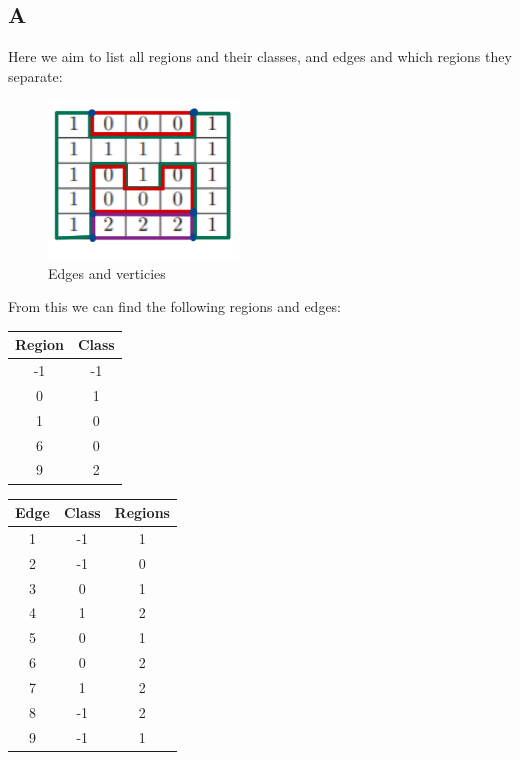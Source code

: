 \documentclass{article}
\begin{document}
\subsection*{A}

Here we aim to list all regions and their classes, and edges and which regions they separate:

\begin{figure}[H]
    \centering
    \includegraphics[width = 0.45\textwidth]{imgs/edges_verticies.png}
    \caption{Edges and verticies}
    \label{fig:edges_verticies}
\end{figure}

From this we can find the following regions and edges:

\begin{center}
    \begin{tabular}{ | c | c | }
        Region & Class \\
        \hline
        -1 & -1 \\
        0 & 1 \\
        1 & 0 \\
        6 & 0\\
        9 & 2 \\
    \end{tabular}
\end{center}

\begin{center}
    \begin{tabular}{| c | c | c |}
        Edge & Class & Regions \\
        \hline
        1 & -1 & 1 \\
        2 & -1 & 0 \\
        3 & 0 & 1 \\
        4 & 1 & 2 \\
        5 & 0 & 1 \\
        6 & 0 & 2 \\
        7 & 1 & 2 \\
        8 & -1 & 2 \\
        9 & -1 & 1
    \end{tabular}
\end{center}
\end{document}
